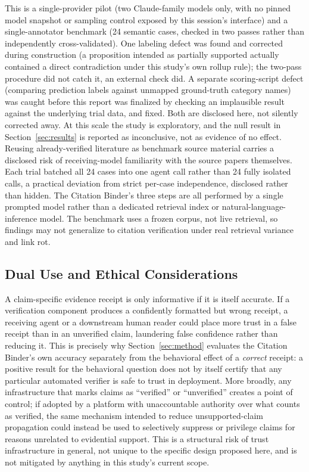 \documentclass[11pt]{article}
\begin{document}
This is a single-provider pilot (two Claude-family models only, with no pinned model
snapshot or sampling control exposed by this session's interface) and a
single-annotator benchmark (24 semantic cases, checked in two passes rather than
independently cross-validated). One labeling defect was found and corrected during
construction (a proposition intended as partially supported actually contained a
direct contradiction under this study's own rollup rule); the two-pass procedure did
not catch it, an external check did. A separate scoring-script defect (comparing
prediction labels against unmapped ground-truth category names) was caught before
this report was finalized by checking an implausible result against the underlying
trial data, and fixed. Both are disclosed here, not silently corrected away. At this
scale the study is exploratory, and the null result in Section~\ref{sec:results} is
reported as inconclusive, not as evidence of no effect. Reusing already-verified
literature as benchmark source material carries a disclosed risk of receiving-model
familiarity with the source papers themselves. Each trial batched all 24 cases into
one agent call rather than 24 fully isolated calls, a practical deviation from strict
per-case independence, disclosed rather than hidden. The Citation Binder's three
steps are all performed by a single prompted model rather than a dedicated retrieval
index or natural-language-inference model. The benchmark uses a frozen corpus, not
live retrieval, so findings may not generalize to citation verification under real
retrieval variance and link rot.

\subsection*{Dual Use and Ethical Considerations}

A claim-specific evidence receipt is only informative if it is itself accurate. If a
verification component produces a confidently formatted but wrong receipt, a
receiving agent or a downstream human reader could place more trust in a false
receipt than in an unverified claim, laundering false confidence rather than reducing
it. This is precisely why Section~\ref{sec:method} evaluates the Citation Binder's
own accuracy separately from the behavioral effect of a \emph{correct} receipt: a
positive result for the behavioral question does not by itself certify that any
particular automated verifier is safe to trust in deployment. More broadly, any
infrastructure that marks claims as ``verified'' or ``unverified'' creates a point of
control; if adopted by a platform with unaccountable authority over what counts as
verified, the same mechanism intended to reduce unsupported-claim propagation could
instead be used to selectively suppress or privilege claims for reasons unrelated to
evidential support. This is a structural risk of trust infrastructure in general, not
unique to the specific design proposed here, and is not mitigated by anything in this
study's current scope.
\end{document}
